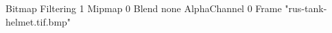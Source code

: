 {Bitmap
	{Filtering 1}
	{Mipmap 0}
	{Blend none}
	{AlphaChannel 0}
	{Frame "rus-tank-helmet.tif.bmp"}
}
